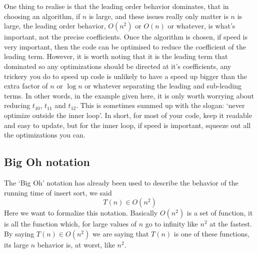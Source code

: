 \documentclass[11pt,a4paper]{scrartcl}
\begin{document}
One thing to realise is that the leading order behavior dominates,
that in choosing an algorithm, if $n$ is large, and these issues
really only matter is $n$ is large, the leading order behavior,
$O(n^2)$ or $O(n)$ or whatever, is what's important, not the precise
coefficients. Once the algorithm is chosen, if speed is very
important, then the code can be optimised to reduce the coefficient of
the leading term. However, it is worth noting that it is the leading
term that dominated so any optimizations should be directed at it's
coefficients, any trickery you do to speed up code is unlikely to have
a speed up bigger than the extra factor of $n$ or $\log{n}$ or
whatever separating the leading and sub-leading terms. In other words,
in the example given here, it is only worth worrying about reducing
$t_{10}$, $t_{11}$ and $t_{12}$. This is sometimes summed up with the
slogan: \lq{}never optimize outside the inner loop\rq{}. In short, for
most of your code, keep it readable and easy to update, but for the
inner loop, if speed is important, squeeze out all the optimizations
you can.


\subsection*{Big Oh notation}

The \lq{}Big Oh\rq{} notation has already been used to describe the
behavior of the running time of insert sort, we said
\begin{equation}
T(n)\in O(n^2)
\end{equation}
Here we want to formalize this notation. Basically $O(n^2)$ is a set
of function, it is all the function which, for large values of $n$ go
to infinity like $n^2$ at the fastest. By saying $T(n)\in O(n^2)$ we
are saying that $T(n)$ is one of these functions, its large $n$
behavior is, at worst, like $n^2$. 
\end{document}
